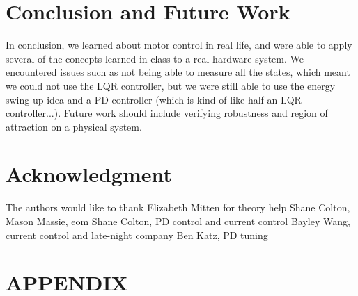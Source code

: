 \documentclass[conference]{IEEEtran}
\begin{document}
\section{Conclusion and Future Work}


In conclusion, we learned about motor control in real life, and were able to
apply several of the concepts learned in class to a real hardware system. We
encountered issues such as not being able to measure all the states, which meant
we could not use the LQR controller, but we were still able to use the energy
swing-up idea and a PD controller (which is kind of like half an LQR
controller...). Future work should include verifying robustness and region of
attraction on a physical system.

\section*{Acknowledgment}

The authors would like to thank Elizabeth Mitten for theory help
Shane Colton, Mason Massie, eom
Shane Colton, PD control and current control
Bayley Wang, current control and late-night company
Ben Katz, PD tuning





\bibdata





\section*{APPENDIX}
\end{document}
